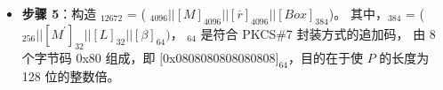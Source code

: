 \documentclass[main\_\_CN.tex]{subfiles}
\begin{document}
\begin{itemize}
    \item {\bfseries 步骤 5}：构造 \begin{math}[P]_{12672}\end{math} = (
            \begin{math}
                [Y]_{4096} ||
                [M]_{4096} ||
                [\overline{r}]_{4096} ||
                [Box]_{384}
            \end{math})。
            其中，\begin{math}[Box]_{384}\end{math} = (
            \begin{math}
                [MD]_{256} ||
                [M^{\prime}]_{32} ||
                [L]_{32} ||
                [\beta]_{64})
            \end{math}，
            \begin{math}[\beta]_{64} \end{math} 是符合 PKCS\#7 封装方式的追加码， 由 8 个字节码 0x80 组成，即 $[$0x0808080808080808$]_{64}$，目的在于使 \begin{math}P\end{math} 的长度为 128 位的整数倍。


\end{itemize}
\end{document}
